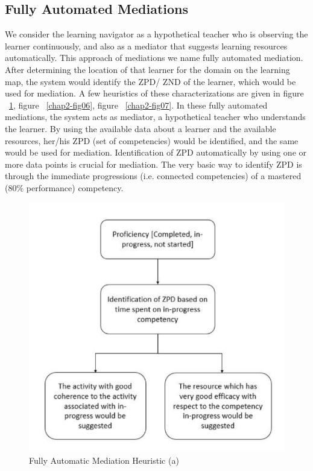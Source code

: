 \begin{multicols}{2}
\subsection{Fully Automated Mediations}
We consider the learning navigator as a hypothetical teacher who is observing the learner continuously, and also as a mediator that suggests learning resources automatically. This approach of mediations we name fully automated mediation. After determining the location of that learner for the domain on the learning map, the system would identify the ZPD/ ZND of the learner, which would be used for mediation. A few heuristics of these characterizations are given in figure ~\ref{chap2-fig05}, figure ~\ref{chap2-fig06}, figure ~\ref{chap2-fig07}. In these fully automated mediations, the system acts as mediator, a hypothetical teacher who understands the learner. By using the available data about a learner and the available resources, her/his ZPD (set of competencies) would be identified, and the same would be used for mediation. Identification of ZPD automatically by using one or more data points is crucial for mediation. The very basic way to identify ZPD is through the immediate progressions (i.e. connected competencies) of a mastered (80\% performance) competency.
\begin{figure}[H]
\centering
\includegraphics[scale=.75]{src/Figures/chap2/chap2-fig05.jpg}
\caption{Fully Automatic Mediation Heuristic (a)}\label{chap2-fig05}
\end{figure}


\end{multicols}
